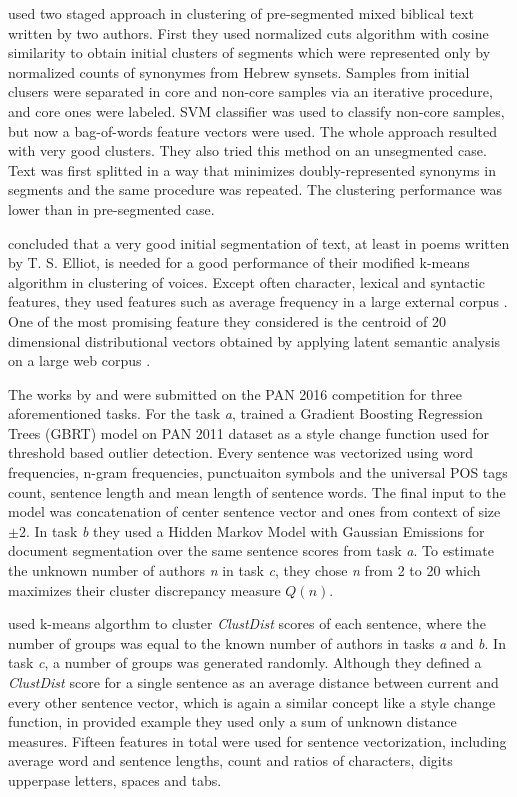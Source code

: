 \documentclass[10pt, a4paper]{article}
\begin{document}
 \citet{koppel-2011} used two staged approach in clustering of pre-segmented mixed biblical text written by two authors. First they used normalized cuts algorithm with cosine similarity to obtain initial clusters of segments which were represented only by normalized counts of synonymes from Hebrew synsets. Samples from initial clusers were separated in core and non-core samples via an iterative procedure, and core ones were labeled. SVM classifier was used to classify non-core samples, but now a bag-of-words feature vectors were used. The whole approach resulted with very good clusters. They also tried this method on an unsegmented case. Text was first splitted in a way that minimizes doubly-represented synonyms in segments and the same procedure was repeated. The clustering performance was lower than in pre-segmented case.

\citet{brooke-2013} concluded that a very good initial segmentation of text, at least in poems written by T. S. Elliot, is needed for a good performance of their modified k-means algorithm in clustering of voices. Except often character, lexical and syntactic features, they used features such as average frequency in a large  external corpus \citep{brants-2006}. One of the most promising feature they considered is the centroid of 20 dimensional distributional vectors obtained by applying latent semantic analysis on a large web corpus \cite{landauer-1997}.

The works by \citet{kuznetsov-2016} and \citet{sittar-2016} were submitted on the PAN 2016 competition for three aforementioned tasks. For the task \textit{a}, \citet{kuznetsov-2016} trained a Gradient Boosting Regression Trees (GBRT) model on PAN 2011 dataset as a style change function used for threshold based outlier detection. Every sentence was vectorized using word frequencies, n-gram frequencies, punctuaiton symbols and the universal POS tags count, sentence length and mean length of sentence words. The final input to the model was concatenation of center sentence vector and ones from context of size $\pm2$. In task \textit{b} they used a Hidden Markov Model with Gaussian Emissions for document segmentation over the same sentence scores from task \textit{a}. To estimate the unknown number of authors \textit{n} in task \textit{c}, they chose \textit{n} from 2 to 20 which maximizes their cluster discrepancy measure $Q(n)$.

\citet{sittar-2016} used k-means algorthm to cluster \textit{ClustDist} scores of each sentence, where the number of groups was equal to the known number of authors in tasks \textit{a} and \textit{b}. In task \textit{c}, a number of groups was generated randomly. Although they defined a \textit{ClustDist} score for a single sentence as an average distance between current and every other sentence vector, which is again a similar concept like a style change function, in provided example they used only a sum of unknown distance measures. Fifteen features in total were used for sentence vectorization, including average word and sentence lengths, count and ratios of characters, digits upperpase letters, spaces and tabs. 
\end{document}
